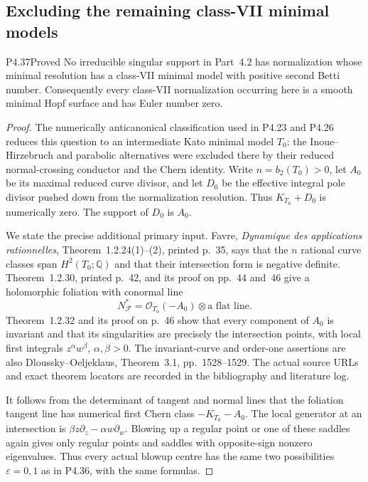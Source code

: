 \subsection{Excluding the remaining class-VII minimal models}

\begin{statement}{P4.37}{Proved}
No irreducible singular support in Part~4.2 has normalization
whose minimal resolution has a class-VII minimal model with
positive second Betti number. Consequently every class-VII
normalization occurring here is a smooth minimal Hopf surface
and has Euler number zero.
\end{statement}
\begin{proof}
The numerically anticanonical classification used in P4.23
and P4.26 reduces this question to an intermediate Kato
minimal model $T_0$: the Inoue--Hirzebruch and parabolic
alternatives were excluded there by their reduced
normal-crossing conductor and the Chern identity.
Write $n=b_2(T_0)>0$, let $A_0$ be its maximal reduced
curve divisor, and let $D_0$ be the effective integral
pole divisor pushed down from the normalization resolution.
Thus $K_{T_0}+D_0$ is numerically zero. The support of
$D_0$ is $A_0$.

We state the precise additional primary input.
Favre, \emph{Dynamique des applications rationnelles},
Theorem~1.2.24(1)--(2), printed p.~35, says that the
$n$ rational curve classes span $H^2(T_0;\mathbb Q)$
and that their intersection form is negative definite.
Theorem~1.2.30, printed p.~42, and its proof on
pp.~44 and~46 give a holomorphic foliation with conormal
line
\[
 N_{\mathcal F}^*=\mathcal O_{T_0}(-A_0)
                       \otimes\text{a flat line}.
\]
Theorem~1.2.32 and its proof on p.~46 show that every
component of $A_0$ is invariant and that its singularities
are precisely the intersection points, with local
first integrals $z^\alpha w^\beta$, $\alpha,\beta>0$.
The invariant-curve and order-one assertions are also
Dloussky--Oeljeklaus, Theorem~3.1, pp.~1528--1529.
The actual source URLs and exact theorem locators are
recorded in the bibliography and literature log.

It follows from the determinant of tangent and normal
lines that the foliation tangent line has numerical
first Chern class $-K_{T_0}-A_0$. The local generator
at an intersection is
$\beta z\partial_z-\alpha w\partial_w$.
Blowing up a regular point or one of these saddles
again gives only regular points and saddles with
opposite-sign nonzero eigenvalues. Thus every actual
blowup centre has the same two possibilities
$\varepsilon=0,1$ as in P4.36, with the same formulas.


\end{proof}
